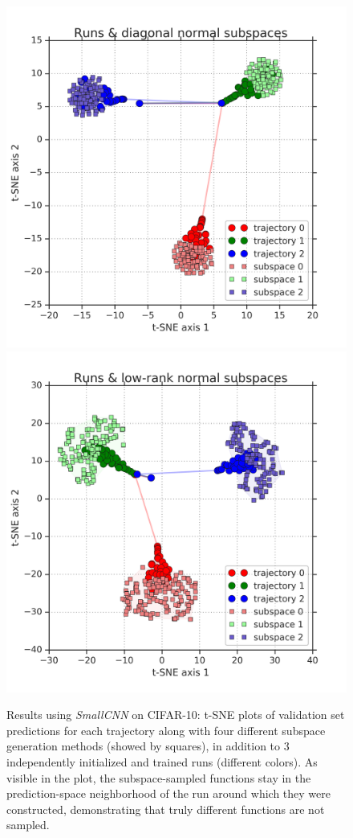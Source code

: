 \documentclass{article}
\newlength{\sfigwidth}
\newlength{\sfigwidthtsne}
\newcommand{\reducespaceafterfigure}{\vspace{-1em}} %
\begin{document}
\begin{figure}[ht]
    \includegraphics[width=\sfigwidthtsne]{figures/standalone_tsnet_runsandsubspace_simplegauss_60215.png}
    \includegraphics[width=\sfigwidthtsne]{figures/standalone_tsnet_runsandsubspace_pcagauss_60215.png}
     \reducespaceafterfigure
     \caption{Results using \textit{SmallCNN} on CIFAR-10: 
    t-SNE plots of validation set predictions for each trajectory along with four different subspace generation methods (showed by squares), in addition to 3 independently initialized and trained runs (different colors). As visible in the plot, the subspace-sampled functions stay in the prediction-space neighborhood of the run around which they were constructed, demonstrating that truly different functions are not sampled.
    }
    \label{fig:tSNE_subspace_plots}%
\end{figure}
\end{document}
